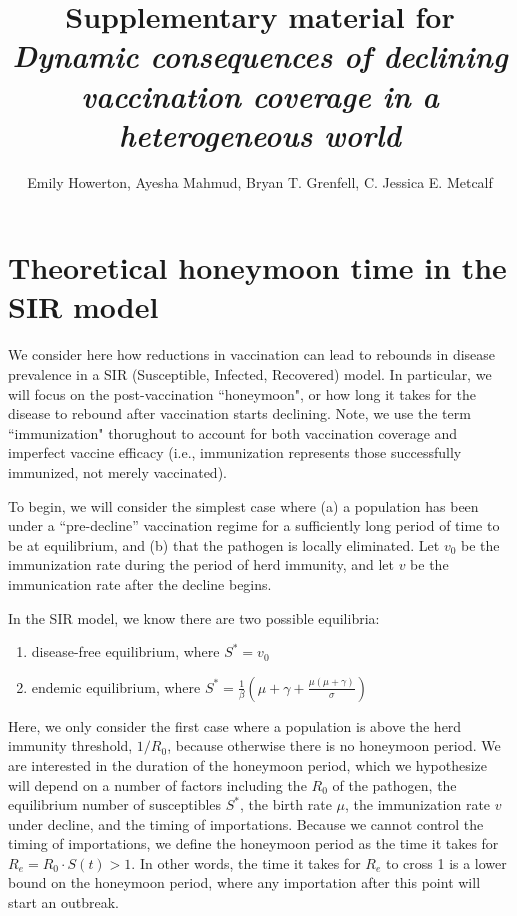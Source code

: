 \documentclass[12pt]{article}
\title{Supplementary material for \\ \textit{Dynamic consequences of declining vaccination coverage in a heterogeneous world}}
\author{Emily Howerton, Ayesha Mahmud, Bryan T. Grenfell, C. Jessica E. Metcalf}
\date{}
\begin{document}
\maketitle


\section{Theoretical honeymoon time in the SIR model}
We consider  here how reductions in vaccination can lead to rebounds in disease prevalence in a SIR (Susceptible, Infected, Recovered) model. In particular, we will focus on the post-vaccination ``honeymoon", or how long it takes for the disease to rebound after vaccination starts declining. Note, we use the term ``immunization" thorughout to account for both vaccination coverage and imperfect vaccine efficacy (i.e., immunization represents those successfully immunized, not merely vaccinated). 

To begin, we will consider the simplest case where (a) a population has been under a ``pre-decline'' vaccination regime for a sufficiently long period of time to be at equilibrium, and (b) that the pathogen is locally eliminated.  Let $v_0$ be the immunization rate during the period of herd immunity, and let $v$ be the immunication rate after the decline begins. 

In the SIR model, we know there are two possible equilibria: 
\begin{enumerate}
    \item disease-free equilibrium, where $S^* = v_0$
    \item endemic equilibrium, where $S^* = \frac{1}{\beta}(\mu + \gamma + \frac{\mu(\mu + \gamma)}{\sigma})$
\end{enumerate}

Here, we only consider the first case where a population is above the herd immunity threshold, $1/R_0$, because otherwise there is no honeymoon period. We are interested in the duration of the honeymoon period, which we hypothesize will depend on a number of factors including the $R_0$ of the pathogen, the equilibrium number of susceptibles $S^*$, the birth rate $\mu$, the immunization rate $v$ under decline, and the timing of importations. Because we cannot control the timing of importations, we define the honeymoon period as the time it takes for $R_e = R_0 \cdot S(t) > 1$. In other words, the time it takes for $R_e$ to cross 1 is a lower bound on the honeymoon period, where any importation after this point will start an outbreak. 
\end{document}
